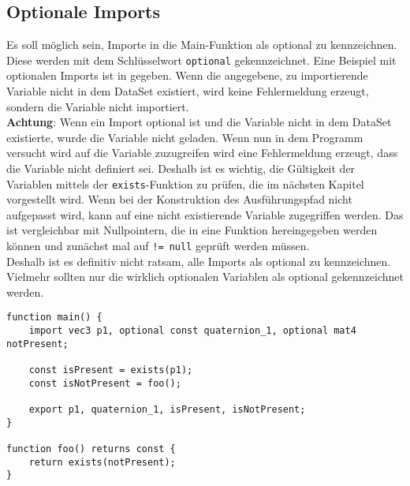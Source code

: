 \subsection{Optionale Imports}
Es soll möglich sein, Importe in die Main-Funktion als optional zu kennzeichnen.
Diese werden mit dem Schlüsselwort \texttt{optional} gekennzeichnet.
Eine Beispiel mit optionalen Imports ist in  gegeben.
Wenn die angegebene, zu importierende Variable nicht in dem DataSet existiert, wird keine Fehlermeldung erzeugt, sondern die Variable nicht importiert.\\
\textbf{Achtung}: Wenn ein Import optional ist und die Variable nicht in dem DataSet existierte, wurde die Variable nicht geladen.
Wenn nun in dem Programm versucht wird auf die Variable zuzugreifen wird eine Fehlermeldung erzeugt, dass die Variable nicht definiert sei.
Deshalb ist es wichtig, die Gültigkeit der Variablen mittels der \texttt{exists}-Funktion zu prüfen, die im nächsten Kapitel vorgestellt wird.
Wenn bei der Konstruktion des Ausführungspfad nicht aufgepasst wird, kann auf eine nicht existierende Variable zugegriffen werden.
Das ist vergleichbar mit Nullpointern, die in eine Funktion hereingegeben werden können und zunächst mal auf \texttt{!= null} geprüft werden müssen.\\
Deshalb ist es definitiv nicht ratsam, alle Imports als optional zu kennzeichnen.
Vielmehr sollten nur die wirklich optionalen Variablen als optional gekennzeichnet werden.

\begin{lstlisting}[language=prepro, label={lst:OptionalImport}, caption={PrePro-Code mit optionalen Imports}, captionpos=b]
function main() {
	import vec3 p1, optional const quaternion_1, optional mat4 notPresent;

	const isPresent = exists(p1);
	const isNotPresent = foo();

	export p1, quaternion_1, isPresent, isNotPresent;
}

function foo() returns const {
	return exists(notPresent);
}
\end{lstlisting}

